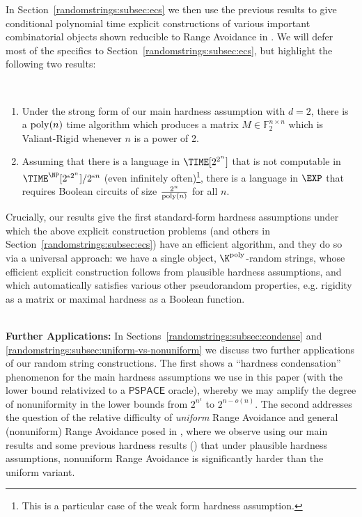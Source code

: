 In Section~\ref{randomstrings:subsec:ecs} we then use the previous results to give conditional polynomial time explicit constructions of various important combinatorial objects shown reducible to Range Avoidance in \cite{Korten21}. We will defer most of the specifics to Section~\ref{randomstrings:subsec:ecs}, but highlight the following two results:
\begin{theorem*}
~
\begin{enumerate}
    \item Under the strong form of our main hardness assumption with $d=2$, there is a $\mathrm{poly}(n)$ time algorithm which produces a matrix $M \in \mathbb{F}_2^{n \times n}$ which is Valiant-Rigid whenever $n$ is a power of 2.
    \item Assuming that there is a language in $\TIME[2^{2^n}]$ that is not computable in $\TIME^\NP[2^{\epsilon 2^n}]/2^{\epsilon n}$ (even infinitely often)\footnote{This is a particular case of the weak form hardness assumption.}, there is a language in $\EXP$ that requires Boolean circuits of size $\frac{2^n}{\mathrm{poly}(n)}$ for all $n$.
\end{enumerate}
\end{theorem*}

Crucially, our results give the first standard-form hardness assumptions under which the above explicit construction problems (and others in Section~\ref{randomstrings:subsec:ecs}) have an efficient algorithm, and they do so via a universal approach: we have a single object, $\K^{\poly}$-random strings, whose efficient explicit construction follows from plausible hardness assumptions, and which automatically satisfies various other pseudorandom properties, e.g. rigidity as a matrix or maximal hardness as a Boolean function. 

~\\
{\bf \noindent Further Applications:} In Sections~\ref{randomstrings:subsec:condense} and \ref{randomstrings:subsec:uniform-vs-nonuniform} we discuss two further applications of our random string constructions. The first shows a ``hardness condensation'' phenomenon for the main hardness assumptions we use in this paper (with the lower bound relativized to a $\mathsf{PSPACE}$ oracle), whereby we may amplify the degree of nonuniformity in the lower bounds from $2^{n^{\epsilon}}$ to $2^{n - o(n)}$.
The second addresses the question of the relative difficulty of \emph{uniform} Range Avoidance and general (nonuniform) Range Avoidance posed in \cite{RSW22,ILW23}, where we observe using our main results and some previous hardness results (\cite{ILW23,ABK24}) that under plausible hardness assumptions, nonuniform Range Avoidance is significantly harder than the uniform variant. 

